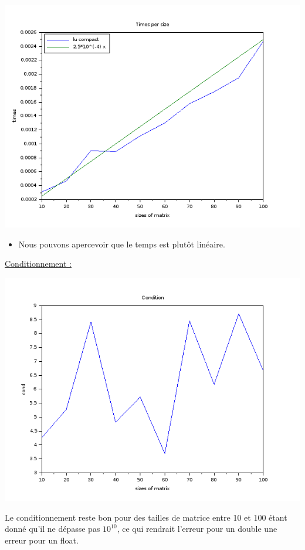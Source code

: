 \documentclass[12pt, letterpaper]{article}
\begin{document}
\includegraphics[scale=0.5]{img/lu_times.png}

\begin{itemize}
\item Nous pouvons apercevoir que le temps est plutôt linéaire.
\end{itemize}

\underline{Conditionnement :}

\includegraphics[scale=0.5]{img/lu_cond.png}

Le conditionnement reste bon pour des tailles de matrice entre 10 et
100 étant donné qu'il ne dépasse pas $10^{10}$, ce qui rendrait l'erreur
pour un double une erreur pour un float.\newline
\end{document}
